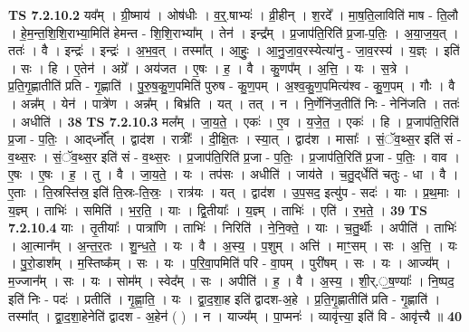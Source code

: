 \documentclass[17pt]{extarticle}
\begin{document}
                  \newline
                                \textbf{ TS 7.2.10.2} \newline
                  यव᳚म् । ग्री॒ष्माय॑ । ओष॑धीः । व॒र्॒.षाभ्यः॑ । व्री॒हीन् । श॒रदे᳚ । मा॒ष॒ति॒लाविति॑ माष - ति॒लौ । हे॒म॒न्त॒शि॒शि॒राभ्या॒मिति॑ हेमन्त - शि॒शि॒राभ्या᳚म् । तेन॑ । इन्द्र᳚म् । प्र॒जाप॑ति॒रिति॑ प्र॒जा-प॒तिः॒ । अ॒या॒ज॒य॒त् । ततः॑ । वै । इन्द्रः॑ । इन्द्रः॑ । अ॒भ॒व॒त् । तस्मा᳚त् । आ॒हुः॒ । आ॒नु॒जा॒व॒रस्येत्या॑नु - जा॒व॒रस्य॑ । य॒ज्ञ्ः । इति॑ । सः । हि । ए॒तेन॑ । अग्रे᳚ । अय॑जत । ए॒षः । ह॒ । वै । कु॒णप᳚म् । अ॒त्ति॒ । यः । स॒त्रे । प्र॒ति॒गृ॒ह्णातीति॑ प्रति - गृ॒ह्णाति॑ । पु॒रु॒ष॒कु॒ण॒पमिति॑ पुरुष - कु॒ण॒पम् । अ॒श्व॒कु॒ण॒पमित्य॑श्व - कु॒ण॒पम् । गौः । वै । अन्न᳚म् । येन॑ । पात्रे॑ण । अन्न᳚म् । बिभ्र॑ति । यत् । तत् । न । नि॒र्णेनि॑ज॒तीति॑ निः - नेनि॑जति । ततः॑ । अधीति॑ । \textbf{  38} \newline
                  \newline
                                \textbf{ TS 7.2.10.3} \newline
                  मल᳚म् । जा॒य॒ते॒ । एकः॑ । ए॒व । य॒जे॒त॒ । एकः॑ । हि । प्र॒जाप॑ति॒रिति॑ प्र॒जा - प॒तिः॒ । आद्‌र्ध्नो᳚त् । द्वाद॑श । रात्रीः᳚ । दी॒क्षि॒तः । स्या॒त् । द्वाद॑श । मासाः᳚ । सं॒ॅव॒थ्स॒र इति॑ सं - व॒थ्स॒रः । सं॒ॅव॒थ्स॒र इति॑ सं - व॒थ्स॒रः । प्र॒जाप॑ति॒रिति॑ प्र॒जा - प॒तिः॒ । प्र॒जाप॑ति॒रिति॑ प्र॒जा - प॒तिः॒ । वाव । ए॒षः । ए॒षः । ह॒ । तु । वै । जा॒य॒ते॒ । यः । तप॑सः । अधीति॑ । जाय॑ते । च॒तु॒द्‌र्धेति॑ चतुः - धा । वै । ए॒ताः । ति॒स्रस्ति॑स्र॒ इति॑ ति॒स्रः-ति॒स्रः॒ । रात्र॑यः । यत् । द्वाद॑श । उ॒प॒सद॒ इत्यु॑प - सदः॑ । याः । प्र॒थ॒माः । य॒ज्ञ्म् । ताभिः॑ । समिति॑ । भ॒र॒ति॒ । याः । द्वि॒तीयाः᳚ । य॒ज्ञ्म् । ताभिः॑ । एति॑ । र॒भ॒ते॒ । \textbf{  39} \newline
                  \newline
                                \textbf{ TS 7.2.10.4} \newline
                  याः । तृ॒तीयाः᳚ । पात्रा॑णि । ताभिः॑ । निरिति॑ । ने॒नि॒क्ते॒ । याः । च॒तु॒र्थीः । अपीति॑ । ताभिः॑ । आ॒त्मान᳚म् । अ॒न्त॒र॒तः । शु॒न्ध॒ते॒ । यः । वै । अ॒स्य॒ । प॒शुम् । अत्ति॑ । माꣳ॒॒सम् । सः । अ॒त्ति॒ । यः । पु॒रो॒डाश᳚म् । म॒स्तिष्क᳚म् । सः । यः । प॒रि॒वा॒पमिति॑ परि - वा॒पम् । पुरी॑षम् । सः । यः । आज्य᳚म् । म॒ज्जान᳚म् । सः । यः । सोम᳚म् । स्वेद᳚म् । सः । अपीति॑ । ह॒ । वै । अ॒स्य॒ । शी॒र्.॒ष॒ण्याः᳚ । नि॒ष्पद॒ इति॑ निः - पदः॑ । प्रतीति॑ । गृ॒ह्णा॒ति॒ । यः । द्वा॒द॒शा॒ह इति॑ द्वादश-अ॒हे । प्र॒ति॒गृ॒ह्णातीति॑ प्रति - गृ॒ह्णाति॑ । तस्मा᳚त् । द्वा॒द॒शा॒हेनेति॑ द्वादश - अ॒हेन॑ ( ) । न । याज्य᳚म् । पा॒प्मनः॑ । व्यावृ॑त्त्या॒ इति॑ वि - आवृ॑त्त्यै ॥ \textbf{  40} \newline
\end{document}
